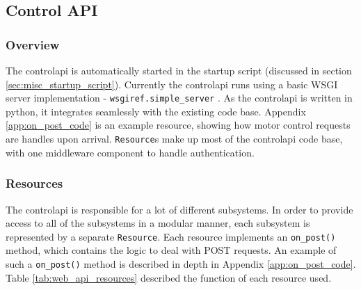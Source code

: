 \subsection{Control API}
\label{sec:des_web_control_api}
\subsubsection{Overview}
The \gls{controlapi} is automatically started in the startup script (discussed in section \ref{sec:misc_startup_script}). Currently the \gls{controlapi} runs using a basic WSGI server implementation - \texttt{wsgiref.simple\_server} \cite{python-wsgiref-simple_server}.
\newline
As the \gls{controlapi} is written in \gls{python}, it integrates seamlessly with the existing code base. Appendix \ref{app:on_post_code} is an example resource, showing how motor control requests are handles upon arrival.
\newline
\texttt{Resource}s make up most of the \gls{controlapi} code base, with one middleware component to handle authentication.



\subsubsection{Resources}

The \gls{controlapi} is responsible for a lot of different subsystems. In order to provide access to all of the subsystems in a modular manner, each subsystem is represented by a separate \texttt{Resource}. Each resource implements an \texttt{on\_post()} \gls{method}, which contains the logic to deal with \gls{POST} requests. An example of such a \texttt{on\_post()} \gls{method} is described in depth in Appendix \ref{app:on_post_code}. Table \ref{tab:web_api_resources} described the function of each resource used.

